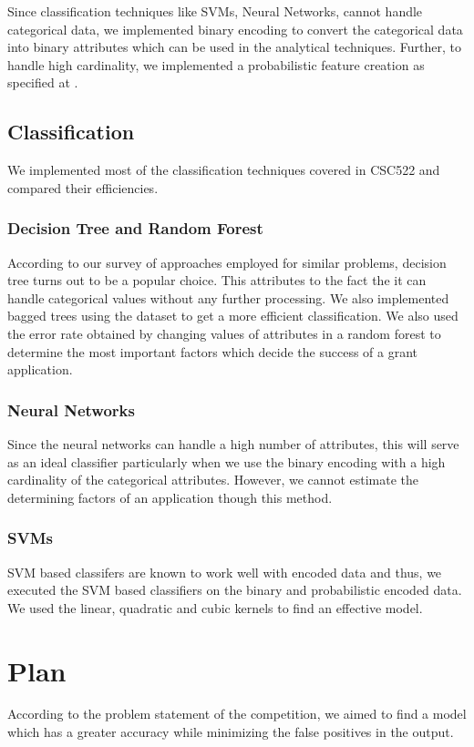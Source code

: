 \documentclass{article} %
\begin{document}
	Since classification techniques like SVMs, Neural Networks, cannot handle categorical data, we implemented binary encoding to convert the categorical data into binary attributes which can be used in the analytical techniques. Further, to handle high cardinality, we implemented a probabilistic feature creation as specified at \cite{HighCard}. 
	
	\subsection{Classification}
	
	We implemented most of the classification techniques covered in CSC522 and compared their efficiencies.
	
	\subsubsection{Decision Tree and Random Forest}
	According to our survey of approaches employed for similar problems, decision tree turns out to be a popular choice. This attributes to the fact the it can handle categorical values without any further processing. We also implemented bagged trees using the dataset to get a more efficient classification. We also used the error rate obtained by changing values of attributes in a random forest to determine the most important factors which decide the success of a grant application.
	
	\subsubsection{Neural Networks}
	Since the neural networks can handle a high number of attributes, this will serve as an ideal classifier particularly when we use the binary encoding with a high cardinality of the categorical attributes. However, we cannot estimate the determining factors of an application though this method.
	
	\subsubsection{SVMs}
	SVM based classifers are known to work well with encoded data and thus, we executed the SVM based classifiers on the binary and probabilistic encoded data. We used the linear, quadratic and cubic kernels to find an effective model. 
	
	\section{Plan}
	According to the problem statement of the competition, we aimed to find a model which has a greater accuracy while minimizing the false positives in the output.
	
\end{document}
